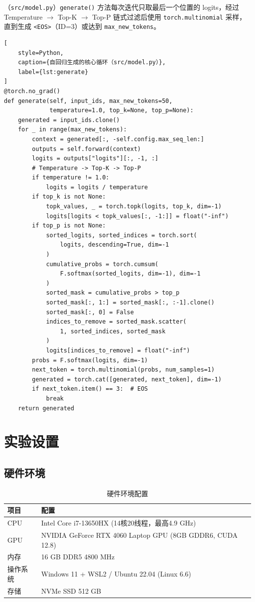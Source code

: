 \documentclass[a4paper, 12pt, centering, AutoFakeBold]{article}
\begin{document}
（\texttt{src/model.py}）\texttt{generate()} 方法每次迭代只取最后一个位置的 logits，经过 Temperature $\to$ Top-K $\to$ Top-P 链式过滤后使用 \texttt{torch.multinomial} 采样，直到生成 \texttt{<EOS>}（ID=3）或达到 \texttt{max\_new\_tokens}。

\begin{lstlisting}[
    style=Python,
    caption={自回归生成的核心循环（src/model.py）},
    label={lst:generate}
]
@torch.no_grad()
def generate(self, input_ids, max_new_tokens=50,
             temperature=1.0, top_k=None, top_p=None):
    generated = input_ids.clone()
    for _ in range(max_new_tokens):
        context = generated[:, -self.config.max_seq_len:]
        outputs = self.forward(context)
        logits = outputs["logits"][:, -1, :]
        # Temperature -> Top-K -> Top-P
        if temperature != 1.0:
            logits = logits / temperature
        if top_k is not None:
            topk_values, _ = torch.topk(logits, top_k, dim=-1)
            logits[logits < topk_values[:, -1:]] = float("-inf")
        if top_p is not None:
            sorted_logits, sorted_indices = torch.sort(
                logits, descending=True, dim=-1
            )
            cumulative_probs = torch.cumsum(
                F.softmax(sorted_logits, dim=-1), dim=-1
            )
            sorted_mask = cumulative_probs > top_p
            sorted_mask[:, 1:] = sorted_mask[:, :-1].clone()
            sorted_mask[:, 0] = False
            indices_to_remove = sorted_mask.scatter(
                1, sorted_indices, sorted_mask
            )
            logits[indices_to_remove] = float("-inf")
        probs = F.softmax(logits, dim=-1)
        next_token = torch.multinomial(probs, num_samples=1)
        generated = torch.cat([generated, next_token], dim=-1)
        if next_token.item() == 3:  # EOS
            break
    return generated
\end{lstlisting}

\section{实验设置}

\subsection{硬件环境}

\begin{table}[H]
\centering
\caption{硬件环境配置}
\label{tab:hardware}
\begin{tabular}{|l|l|}
\hline
\textbf{项目} & \textbf{配置} \\
\hline
CPU    & Intel Core i7-13650HX (14核20线程，最高4.9 GHz) \\
GPU    & NVIDIA GeForce RTX 4060 Laptop GPU (8GB GDDR6, CUDA 12.8) \\
内存   & 16 GB DDR5 4800 MHz \\
操作系统 & Windows 11 + WSL2 / Ubuntu 22.04 (Linux 6.6) \\
存储   & NVMe SSD 512 GB \\
\hline
\end{tabular}
\end{table}
\end{document}
